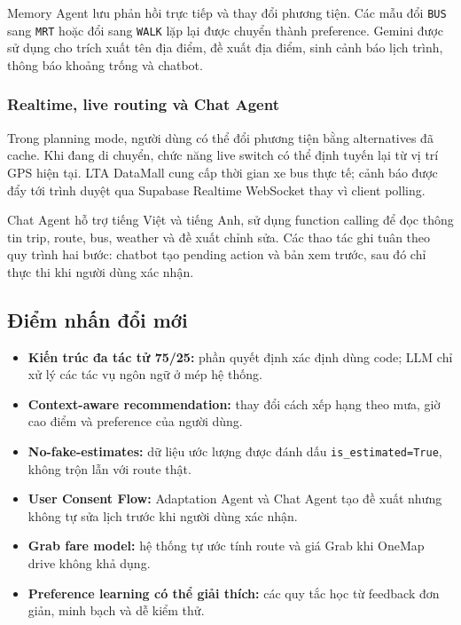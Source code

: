 \documentclass[12pt,a4paper]{article}
\begin{document}
Memory Agent lưu phản hồi trực tiếp và thay đổi phương tiện. Các mẫu đổi \texttt{BUS} sang \texttt{MRT} hoặc đổi sang \texttt{WALK} lặp lại được chuyển thành preference. Gemini được sử dụng cho trích xuất tên địa điểm, đề xuất địa điểm, sinh cảnh báo lịch trình, thông báo khoảng trống và chatbot.

\subsubsection{Realtime, live routing và Chat Agent}

Trong planning mode, người dùng có thể đổi phương tiện bằng alternatives đã cache. Khi đang di chuyển, chức năng live switch có thể định tuyến lại từ vị trí GPS hiện tại. LTA DataMall cung cấp thời gian xe bus thực tế; cảnh báo được đẩy tới trình duyệt qua Supabase Realtime WebSocket thay vì client polling.

Chat Agent hỗ trợ tiếng Việt và tiếng Anh, sử dụng function calling để đọc thông tin trip, route, bus, weather và đề xuất chỉnh sửa. Các thao tác ghi tuân theo quy trình hai bước: chatbot tạo pending action và bản xem trước, sau đó chỉ thực thi khi người dùng xác nhận.

\subsection{Điểm nhấn đổi mới}


\begin{itemize}
    \item \textbf{Kiến trúc đa tác tử 75/25:} phần quyết định xác định dùng code; LLM chỉ xử lý các tác vụ ngôn ngữ ở mép hệ thống.
    \item \textbf{Context-aware recommendation:} thay đổi cách xếp hạng theo mưa, giờ cao điểm và preference của người dùng.
    \item \textbf{No-fake-estimates:} dữ liệu ước lượng được đánh dấu \texttt{is\_estimated=True}, không trộn lẫn với route thật.
    \item \textbf{User Consent Flow:} Adaptation Agent và Chat Agent tạo đề xuất nhưng không tự sửa lịch trước khi người dùng xác nhận.
    \item \textbf{Grab fare model:} hệ thống tự ước tính route và giá Grab khi OneMap drive không khả dụng.
    \item \textbf{Preference learning có thể giải thích:} các quy tắc học từ feedback đơn giản, minh bạch và dễ kiểm thử.
\end{itemize}
\end{document}
